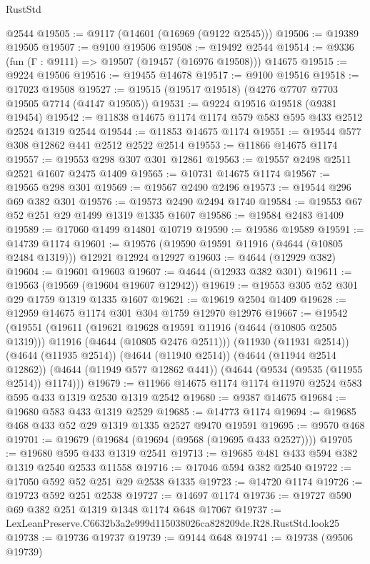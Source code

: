 \begin{lexlean}{RustStd}
\begin{coremodule}
    @2544
@19505 := @9117 (@14601 (@16969 (@9122 @2545)))
@19506 := @19389 @19505
@19507 := @9100 @19506
@19508 := @19492 @2544
@19514 := @9336 (fun (Γ : @9111) => @19507 (@19457 (@16976 @19508))) @14675
@19515 := @9224 @19506
@19516 := @19455 @14678
@19517 := @9100 @19516
@19518 := @17023 @19508
@19527 := @19515 (@19517 @19518) (@4276 @7707 @7703 @19505 @7714 (@4147 @19505))
@19531 := @9224 @19516 @19518 (@9381 @19454)
@19542 := @11838 @14675 @1174 @1174 @579 @583 @595 @433 @2512 @2524 @1319 @2544
@19544 := @11853 @14675 @1174
@19551 := @19544 @577 @308 @12862 @441 @2512 @2522 @2514
@19553 := @11866 @14675 @1174
@19557 := @19553 @298 @307 @301 @12861
@19563 := @19557 @2498 @2511 @2521 @1607 @2475 @1409
@19565 := @10731 @14675 @1174
@19567 := @19565 @298 @301
@19569 := @19567 @2490 @2496
@19573 := @19544 @296 @69 @382 @301
@19576 := @19573 @2490 @2494 @1740
@19584 := @19553 @67 @52 @251 @29 @1499 @1319 @1335 @1607
@19586 := @19584 @2483 @1409
@19589 := @17060 @1499 @14801 @10719
@19590 := @19586 @19589
@19591 := @14739 @1174
@19601 := @19576 (@19590 @19591 @11916 (@4644 (@10805 @2484 @1319))) @12921 @12924 @12927
@19603 := @4644 (@12929 @382)
@19604 := @19601 @19603
@19607 := @4644 (@12933 @382 @301)
@19611 := @19563 (@19569 (@19604 @19607 @12942))
@19619 := @19553 @305 @52 @301 @29 @1759 @1319 @1335 @1607
@19621 := @19619 @2504 @1409
@19628 := @12959 @14675 @1174 @301 @304 @1759 @12970 @12976
@19667 := @19542
    (@19551
      (@19611
        (@19621 @19628 @19591 @11916 (@4644 (@10805 @2505 @1319)))
        @11916
        (@4644 (@10805 @2476 @2511)))
      (@11930 (@11931 @2514))
      (@4644 (@11935 @2514))
      (@4644 (@11940 @2514))
      (@4644 (@11944 @2514 @12862))
      (@4644 (@11949 @577 @12862 @441))
      (@4644 (@9534 (@9535 (@11955 @2514)) @1174)))
@19679 := @11966 @14675 @1174 @1174 @11970 @2524 @583 @595 @433 @1319 @2530 @1319 @2542
@19680 := @9387 @14675
@19684 := @19680 @583 @433 @1319 @2529
@19685 := @14773 @1174
@19694 := @19685 @468 @433 @52 @29 @1319 @1335 @2527 @9470 @19591
@19695 := @9570 @468
@19701 := @19679 (@19684 (@19694 (@9568 (@19695 @433 @2527))))
@19705 := @19680 @595 @433 @1319 @2541
@19713 := @19685 @481 @433 @594 @382 @1319 @2540 @2533 @11558
@19716 := @17046 @594 @382 @2540
@19722 := @17050 @592 @52 @251 @29 @2538 @1335
@19723 := @14720 @1174
@19726 := @19723 @592 @251 @2538
@19727 := @14697 @1174
@19736 := @19727 @590 @69 @382 @251 @1319 @1348 @1174 @648 @17067
@19737 := LexLeanPreserve.C6632b3a2e999d115038026ca828209de.R28.RustStd.look25
@19738 := @19736 @19737
@19739 := @9144 @648
@19741 := @19738 (@9506 @19739)

\end{coremodule}
\end{lexlean}
